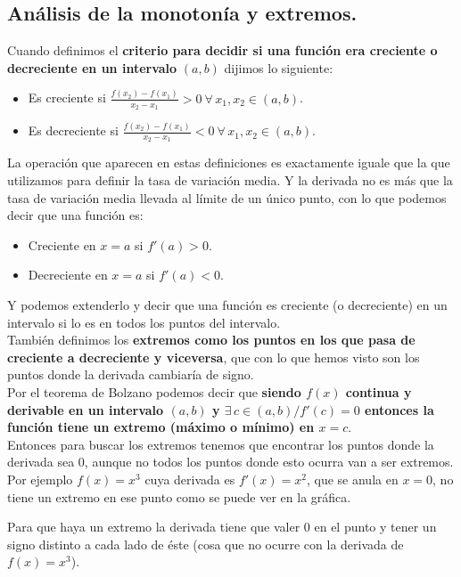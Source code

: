 \documentclass[a4paper,11pt,answers]{exam}
\begin{document}
\subsection{Análisis de la monotonía y extremos.} \label{monotonia}
Cuando definimos el \textbf{criterio para decidir si una función era creciente o decreciente en un intervalo} $(a,b)$ dijimos lo siguiente:
\begin{itemize}
	\item Es creciente si $\frac{f(x_2) - f(x_1)}{x_2- x_1}>0\ \forall\,x_1, x_2 \in (a,b)$.
	\item Es decreciente si $\frac{f(x_2) - f(x_1)}{x_2- x_1}<0\ \forall\,x_1, x_2 \in (a,b)$.
\end{itemize}

La operación que aparecen en estas definiciones es exactamente iguale que la que utilizamos para definir la tasa de variación media. Y la derivada no es más que la tasa de variación media llevada al límite de un único punto, con lo que podemos decir que una función es:
\begin{itemize}
	\item Creciente en $x=a$ si $f'(a) > 0$.
	\item Decreciente en $x=a$ si $f'(a) < 0$.
\end{itemize}
Y podemos extenderlo y decir que una función es creciente (o decreciente) en un intervalo si lo es en todos los puntos del intervalo.\\

También definimos los \textbf{extremos como los puntos en los que pasa de creciente a decreciente y viceversa}, que con lo que hemos visto son los puntos donde la derivada cambiaría de signo.\\

Por el teorema de Bolzano podemos decir que \textbf{siendo $f(x)$ continua y derivable en un intervalo $(a, b)$  y $\exists\,c \in (a,b)/f'(c) = 0$ entonces la función tiene un extremo (máximo o mínimo) en $x=c$}.\\

Entonces para buscar los extremos tenemos que encontrar los puntos donde la derivada sea 0, aunque no todos los puntos donde esto ocurra van a ser extremos. Por ejemplo $f(x) = x^3$ cuya derivada es $f'(x) = x^2$, que se anula en $x=0$, no tiene un extremo en ese punto como se puede ver en la gráfica.
\begin{center}
\end{center}
Para que haya un extremo la derivada tiene que valer 0 en el punto y tener un signo distinto a cada lado de éste (cosa que no ocurre con la derivada de $f(x) = x^3$).\\
\end{document}
